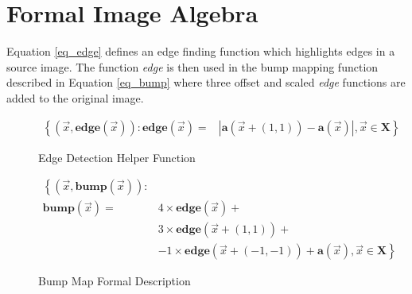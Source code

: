 \documentclass[12pt]{article}
\begin{document}
\section{Formal Image Algebra}
Equation \ref{eq_edge} defines an edge finding function which highlights edges in a source image. The function \emph{edge} is then used in the bump mapping function described in Equation \ref{eq_bump} where three offset and scaled \emph{edge} functions are added to the original image.

\begin{figure}
\begin{equation}\label{eq_edge}
\begin{aligned}
\left\{ \left( \vec{x}, \textbf{edge}(\vec{x}) \right) : \textbf{edge}(\vec{x}) = \right. & \left. | \textbf{a}(\vec{x}+(1,1)) - \textbf{a}(\vec{x}) |, \vec{x} \in  \textbf{X} \right\}
\end{aligned}
\end{equation}
\caption{Edge Detection Helper Function}
\end{figure}

\begin{figure}
\begin{equation}\label{eq_bump}
\begin{aligned}
\left\{ \left( \vec{x}, \textbf{bump}(\vec{x}) \right) : \right. & \\
\left. \textbf{bump}(\vec{x}) = \right. & \left. 4 \times \textbf{edge}(\vec{x}) + \right. \\
& \left. 3 \times \textbf{edge}(\vec{x}+(1,1)) + \right. \\
& \left. -1 \times \textbf{edge}(\vec{x}+(-1,-1)) + \textbf{a}(\vec{x}) , \vec{x} \in  \textbf{X} \right\}
\end{aligned}
\end{equation}
\caption{Bump Map Formal Description}
\end{figure}
\end{document}
